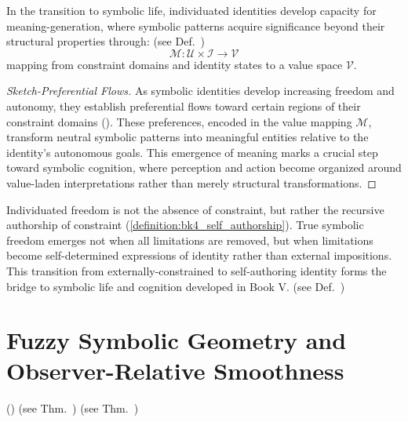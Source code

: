 \begin{corollary} \label{corollary:bk4_emergence_of_meaning}
In the transition to symbolic life, individuated identities develop capacity for meaning-generation, where symbolic patterns acquire significance beyond their structural properties through: (see Def.~)
\begin{equation}
    \mathcal{M}: \mathcal{U} \times \mathcal{I} \to \mathcal{V}
\end{equation}
mapping from constraint domains and identity states to a value space $\mathcal{V}$.
\end{corollary}
\begin{proof}[Sketch-Preferential Flows]
\label{proof:bk_sketch_preferential_flows}
As symbolic identities develop increasing freedom and autonomy, they establish preferential flows toward certain regions of their constraint domains (). These preferences, encoded in the value mapping $\mathcal{M}$, transform neutral symbolic patterns into meaningful entities relative to the identity's autonomous goals.
This emergence of meaning marks a crucial step toward symbolic cognition, where perception and action become organized around value-laden interpretations rather than merely structural transformations.
\end{proof}
\begin{remark}
\label{remark:bk4_individuated_freedom}
Individuated freedom is not the absence of constraint, but rather the recursive authorship of constraint (\ref{definition:bk4_self_authorship}). True symbolic freedom emerges not when all limitations are removed, but when limitations become self-determined expressions of identity rather than external impositions. This transition from externally-constrained to self-authoring identity forms the bridge to symbolic life and cognition developed in Book V. (see Def.~)
\end{remark}
\section{Fuzzy Symbolic Geometry and Observer-Relative Smoothness} () (see Thm.~) \label{sec:bk4_fuzzy_symbolic_geometry_observer_relative_smoothness}
 (see Thm.~)
